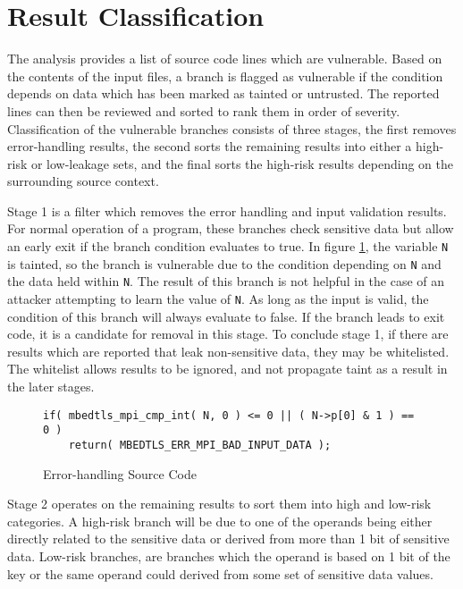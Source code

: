 \section{Result Classification}

The analysis provides a list of source code lines which are vulnerable. Based on
the contents of the input files, a branch is flagged as vulnerable if the
condition depends on data which has been marked as tainted or untrusted. The
reported lines can then be reviewed and sorted to rank them in order of
severity. Classification of the vulnerable branches consists of three stages,
the first removes error-handling results, the second sorts the remaining results
into either a high-risk or low-leakage sets, and the final sorts the high-risk results
depending on the surrounding source context.

Stage 1 is a filter which removes the error handling and input validation
results. For normal operation of a program, these branches check sensitive data
but allow an early exit if the branch condition evaluates to true. In figure
\ref{alg:stage0src}, the variable \texttt{N} is tainted, so the branch is
vulnerable due to the condition depending on \texttt{N} and the data held within
\texttt{N}. The result of this branch is not helpful in the case of an attacker
attempting to learn the value of \texttt{N}. As long as the input is valid, the
condition of this branch will always evaluate to false. If the branch leads to
exit code, it is a candidate for removal in this stage. To conclude stage 1, if
there are results which are reported that leak non-sensitive data, they may be
whitelisted. The whitelist allows results to be ignored, and not propagate taint
as a result in the later stages.

\begin{figure}[h!]
\begin{lstlisting}
if( mbedtls_mpi_cmp_int( N, 0 ) <= 0 || ( N->p[0] & 1 ) == 0 )
    return( MBEDTLS_ERR_MPI_BAD_INPUT_DATA );
\end{lstlisting}
\caption{Error-handling Source Code}
\label{alg:stage0src}
\end{figure}

Stage 2 operates on the remaining results to sort them into high and low-risk
categories. A high-risk branch will be due to one of the operands being either
directly related to the sensitive data or derived from more than 1 bit of
sensitive data. Low-risk branches, are branches which the operand is based on 1
bit of the key or the same operand could derived from some set of sensitive data
values.

